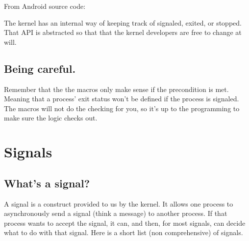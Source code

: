 From Android source code:

\begin{Shaded}
\begin{Highlighting}[]







\end{Highlighting}
\end{Shaded}

The kernel has an internal way of keeping track of signaled, exited, or
stopped. That API is abstracted so that that the kernel developers are
free to change at will.

\subsection{Being careful.}\label{being-careful.}

Remember that the the macros only make sense if the precondition is met.
Meaning that a process' exit status won't be defined if the process is
signaled. The macros will not do the checking for you, so it's up to the
programming to make sure the logic checks out.

\section{Signals}\label{signals}

\subsection{What's a signal?}\label{whats-a-signal}

A signal is a construct provided to us by the kernel. It allows one
process to asynchronously send a signal (think a message) to another
process. If that process wants to accept the signal, it can, and then,
for most signals, can decide what to do with that signal. Here is a
short list (non comprehensive) of signals.

